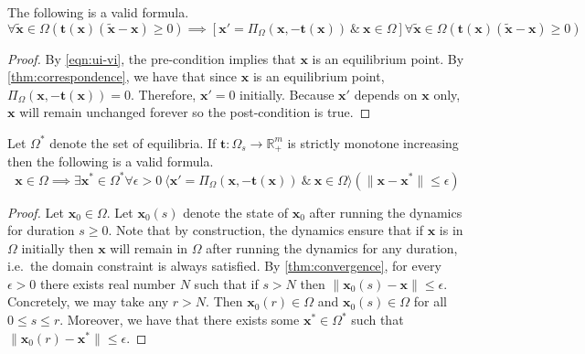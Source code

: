 \begin{theorem}
    The following is a valid formula.
    $$\forall \mathbf{\tilde{x}} \in \Omega (\mathbf{t}(\mathbf{x})(\mathbf{\tilde{x}}- \mathbf{x}) \geq 0) \implies [\mathbf{x}'=\Pi_{\Omega}(\mathbf{x}, -\mathbf{t}(\mathbf{x}))\ \&\ \mathbf{x}\in \Omega] \forall \mathbf{\tilde{x}} \in \Omega (\mathbf{t}(\mathbf{x})(\mathbf{\tilde{x}}- \mathbf{x}) \geq 0)$$
\end{theorem}

\begin{proof}
    By \eqref{eqn:ui-vi}, the pre-condition implies that $\mathbf{x}$ is an equilibrium point.
    By \cref{thm:correspondence}, we have that since $\mathbf{x}$ is an equilibrium point,  $\Pi_{\Omega}(\mathbf{x}, -\mathbf{t}(\mathbf{x})) = 0$.
    Therefore, $\mathbf{x}'=0$ initially. Because $\mathbf{x}'$ depends on $\mathbf{x}$ only, $\mathbf{x}$ will remain unchanged forever so the post-condition is true.
\end{proof}

\begin{theorem}
    \label{thm:dl:convergence}
    Let $\Omega^*$ denote the set of equilibria.
    If $\mathbf{t}: \Omega_s \to \mathbb{R}^m_+$ is strictly monotone increasing then the following is a valid formula.
    $$\mathbf{x} \in \Omega \implies \exists \mathbf{x}^*\in \Omega^* \forall \epsilon > 0\ \langle \mathbf{x}'=\Pi_{\Omega}(\mathbf{x}, -\mathbf{t}(\mathbf{x}))\ \&\ \mathbf{x}\in \Omega\rangle ( \|\mathbf{x} - \mathbf{x}^*\| \leq \epsilon)$$
\end{theorem}

\begin{proof}
    Let $\mathbf{x}_0 \in \Omega$. Let $\mathbf{x}_0(s)$ denote the state of $\mathbf{x}_0$ after running the dynamics for duration $s\geq 0$.
    Note that by construction, the dynamics ensure that if $\mathbf{x}$ is in $\Omega$ initially then $\mathbf{x}$ will remain in $\Omega$ after running the dynamics for any duration, i.e.\ the domain constraint is always satisfied.
    By \cref{thm:convergence}, for every $\epsilon > 0$ there exists real number $N$ such that if $s > N$ then $\|\mathbf{x}_0(s) - \mathbf{x}\| \leq \epsilon$. 
    Concretely, we may take any $r > N$.
    Then $\mathbf{x}_0(r) \in \Omega$ and $\mathbf{x}_0(s) \in \Omega$ for all $0 \leq s \leq r$.
    Moreover, we have that there exists some $\mathbf{x}^*\in \Omega^*$  such that $\|\mathbf{x}_0(r) - \mathbf{x}^*\| \leq \epsilon$.
\end{proof}

